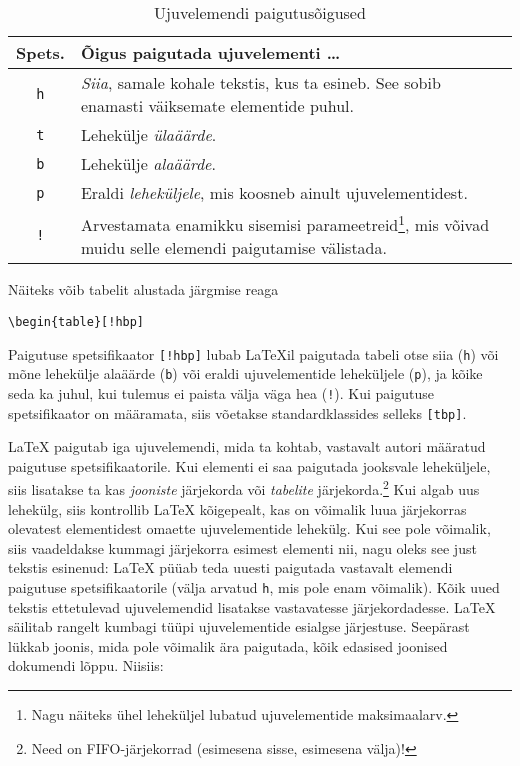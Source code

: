 \begin{table}[tbp]
\caption{Ujuvelemendi paigutusõigused}\label{tab:permiss}
\noindent \begin{minipage}{\textwidth}
\medskip
\begin{center}
\begin{tabular}{@{}cp{8cm}@{}}
Spets.&Õigus paigutada ujuvelementi \ldots\\
\hline
\rule{0pt}{1.05em}\texttt{h} & \emph{Siia}, samale kohale tekstis, kus
ta esineb. See sobib enamasti väiksemate elementide puhul.\\[0.3ex]
\texttt{t} & Lehekülje \emph{ülaäärde}.\\[0.3ex]
\texttt{b} & Lehekülje \emph{alaäärde}.\\[0.3ex]
\texttt{p} & Eraldi \emph{leheküljele}, mis koosneb ainult
ujuv\-ele\-men\-ti\-dest.\\[0.3ex]
\texttt{!} & Arvestamata enamikku sisemisi parameetreid\footnote{Nagu
näiteks ühel leheküljel lubatud ujuvelementide maksimaalarv.}, mis
võivad muidu selle elemendi paigutamise välistada.
\end{tabular}
\end{center}
\end{minipage}
\end{table}

Näiteks võib tabelit alustada järgmise reaga
\begin{code}
\verb|\begin{table}[!hbp]|
\end{code}
\noindent {}Paigutuse spetsifikaator \verb|[!hbp]| lubab \LaTeX il
paigutada tabeli otse siia (\texttt{h}) või mõne lehekülje alaäärde
(\texttt{b}) või eraldi ujuvelementide leheküljele (\texttt{p}), ja
kõike seda ka juhul, kui tulemus ei paista välja väga hea (\texttt{!}).
Kui paigutuse spetsifikaator on määramata, siis võetakse
standardklassides selleks \verb|[tbp]|.

\LaTeX{} paigutab iga ujuvelemendi, mida ta kohtab, vastavalt autori
määratud paigutuse spetsifikaatorile. Kui elementi ei saa paigutada
jooksvale leheküljele, siis lisatakse ta kas \emph{jooniste} järjekorda
või \emph{tabelite} järjekorda.\footnote{Need on FIFO-järjekorrad
(esimesena sisse, esimesena välja)!} Kui algab uus lehekülg, siis
kontrollib \LaTeX{} kõigepealt, kas on võimalik luua järjekorras
olevatest elementidest omaette ujuvelementide lehekülg. Kui see pole
võimalik, siis vaadeldakse kummagi järjekorra esimest elementi nii, nagu
oleks see just tekstis esinenud: \LaTeX{} püüab teda uuesti paigutada
vastavalt elemendi paigutuse spetsifikaatorile (välja arvatud
\texttt{h}, mis pole enam võimalik). Kõik uued tekstis ettetulevad
ujuvelemendid lisatakse vastavatesse järjekordadesse. \LaTeX{} säilitab
rangelt kumbagi tüüpi ujuvelementide esialgse järjestuse. Seepärast
lükkab joonis, mida pole võimalik ära paigutada, kõik edasised joonised
dokumendi lõppu. Niisiis:

